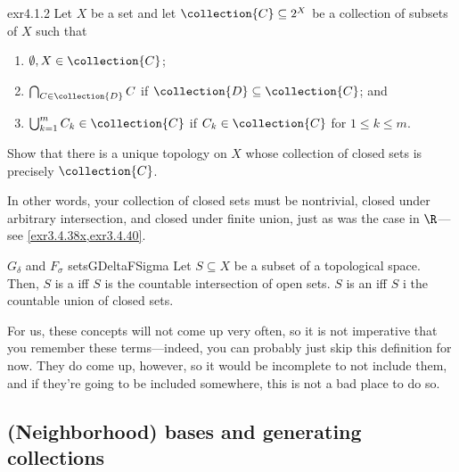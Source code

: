 \begin{exr}{}{exr4.1.2}
Let $X$ be a set and let $\collection{C}\subseteq 2^X$ be a collection of subsets of $X$ such that
\begin{enumerate}
\item $\emptyset ,X\in \collection{C}$;
\item $\bigcap _{C\in \collection{D}}C$ if $\collection{D}\subseteq \collection{C}$; and
\item $\bigcup _{k=1}^mC_k\in \collection{C}$ if $C_k\in \collection{C}$ for $1\leq k\leq m$.
\end{enumerate}
Show that there is a unique topology on $X$ whose collection of closed sets is precisely $\collection{C}$.
\begin{rmk}
In other words, your collection of closed sets must be nontrivial, closed under arbitrary intersection, and closed under finite union, just as was the case in $\R$---see \cref{exr3.4.38x,exr3.4.40}.
\end{rmk}
\end{exr}
\begin{dfn}{$G_\delta$ and $F_\sigma$ sets}{GDeltaFSigma}
Let $S\subseteq X$ be a subset of a topological space.  Then, $S$ is a  iff $S$ is the countable intersection of open sets.  $S$ is an  iff $S$ i the countable union of closed sets.
\begin{rmk}
For us, these concepts will not come up very often, so it is not imperative that you remember these terms---indeed, you can probably just skip this definition for now.  They do come up, however, so it would be incomplete to not include them, and if they're going to be included somewhere, this is not a bad place to do so.
\end{rmk}
\end{dfn}

\subsection{(Neighborhood) bases and generating collections}

